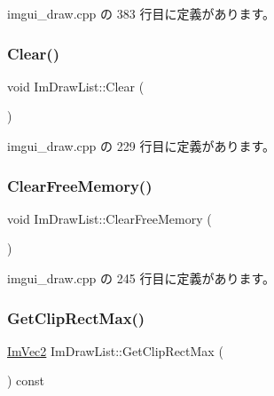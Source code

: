  imgui\+\_\+draw.\+cpp の 383 行目に定義があります。

\mbox{\label{struct_im_draw_list_ac422590c71dc5593aea52f65793aee81}} 
\subsubsection{\texorpdfstring{Clear()}{Clear()}}
{\footnotesize\ttfamily void Im\+Draw\+List\+::\+Clear (\begin{DoxyParamCaption}{ }\end{DoxyParamCaption})}



 imgui\+\_\+draw.\+cpp の 229 行目に定義があります。

\mbox{\label{struct_im_draw_list_a8b2686e006f57c554b709dfc47e2ad63}} 
\subsubsection{\texorpdfstring{Clear\+Free\+Memory()}{ClearFreeMemory()}}
{\footnotesize\ttfamily void Im\+Draw\+List\+::\+Clear\+Free\+Memory (\begin{DoxyParamCaption}{ }\end{DoxyParamCaption})}



 imgui\+\_\+draw.\+cpp の 245 行目に定義があります。

\mbox{\label{struct_im_draw_list_a8e484a61eab501c1c1c416a8b45bb08e}} 
\subsubsection{\texorpdfstring{Get\+Clip\+Rect\+Max()}{GetClipRectMax()}}
{\footnotesize\ttfamily \mbox{\hyperlink{struct_im_vec2}{Im\+Vec2}} Im\+Draw\+List\+::\+Get\+Clip\+Rect\+Max (\begin{DoxyParamCaption}{ }\end{DoxyParamCaption}) const\hspace{0.3cm}{\ttfamily [inline]}}



